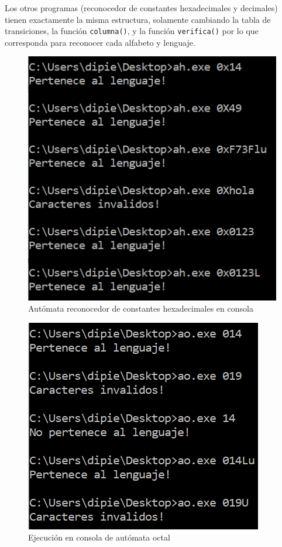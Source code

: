 \documentclass[a4paper, 12pt]{article}
\begin{document}
Los otros programas (reconocedor de constantes hexadecimales y decimales) tienen exactamente la misma estructura, solamente cambiando la tabla de transiciones, la función \texttt{columna()}, y la función \texttt{verifica()} por lo que corresponda para reconocer cada alfabeto y lenguaje.

\begin{figure}[b]
  \centering
  \includegraphics{images/automataHexa.PNG}
  \caption{Autómata reconocedor de constantes hexadecimales en consola}
  \label{fig:hexa-consola}
\end{figure}

\begin{figure}[b]
    \centering
    \includegraphics{automataOctal.PNG}
    \caption{Ejecución en consola de autómata octal}
    \label{fig:octal-consola}
\end{figure}
\end{document}
